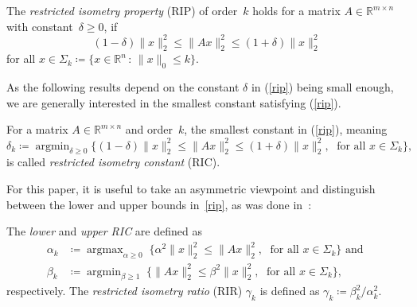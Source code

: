 \documentclass[a4paper,11pt,1p]{elsarticle}
\DeclareMathOperator*{\argmin}{argmin}
\DeclareMathOperator*{\argmax}{argmax}
\newcommand{\suchthat}{\,:\,}
\newcommand{\define}{\coloneqq}
\newcommand{\Norm}[2]{\lVert{#1}\rVert_{#2}}
\newcommand{\R}{\mathds{R}}
\begin{document}
\begin{definition}\label{ripdef}
  The \emph{restricted isometry property} (RIP) of order~$k$ holds for a
  matrix $A \in \R^{m \times n}$ with constant~$\delta \geq 0$, if
  \begin{equation}\label{rip}
    (1 - \delta) \Norm{x}{2}^2 \leq \Norm{Ax}{2}^2 \leq (1+\delta) \Norm{x}{2}^2
  \end{equation}
  for all $x \in \Sigma_k \define \{x \in \R^n \suchthat \Norm{x}{0} \leq k\}$.
\end{definition}

As the following results depend on the constant $\delta$ in (\ref{rip}) being
small enough, we are generally interested in the smallest constant satisfying
(\ref{rip}).

\begin{definition}\label{ricdef}
For a matrix $A \in \R^{m \times n}$ and order~$k$, the smallest constant in 
(\ref{rip}), meaning
\begin{equation}\label{ric}
 \delta_k \define \argmin_{\delta \geq 0} \{(1 - \delta) \Norm{x}{2}^2 \leq \Norm{Ax}{2}^2 \leq (1+\delta) \Norm{x}{2}^2 ,\; \text{ for all }x \in \Sigma_k\},
\end{equation}
is called \emph{restricted isometry constant} (RIC).
\end{definition}

For this paper, it is useful to take an asymmetric viewpoint and
distinguish between the lower and upper bounds in~\eqref{rip}, as was done
in~\cite{FL09}:

\begin{definition}\label{asymRIPdef}
 The \emph{lower} and \emph{upper RIC} are defined as
 \begin{align}
   \alpha_k & \define \argmax_{\alpha \geq 0}\; \{ \alpha^2 \Norm{x}{2}^2
   \leq \Norm{Ax}{2}^2,\; \text{ for all }x \in \Sigma_k\}\text{ and }\label{lowerRIP}\\
   \beta_k & \define \argmin_{\beta \geq 1}\; \{ \Norm{Ax}{2}^2 \leq \beta^2
   \Norm{x}{2}^2,\; \text{ for all }x \in \Sigma_k\},\label{upperRIP}
 \end{align}
 respectively. The \emph{restricted isometry ratio} (RIR) $\gamma_k$ is
 defined as $\gamma_k \define \beta_k^2 / \alpha_k^2$.
\end{definition}
\end{document}
